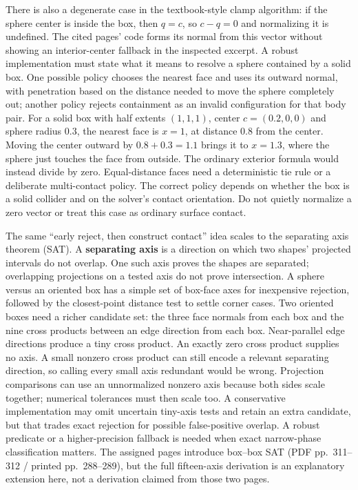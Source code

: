 There is also a degenerate case in the textbook-style clamp algorithm: if the sphere center is inside the box, then \(q=c\), so \(c-q=0\) and normalizing it is undefined. The cited pages' code forms its normal from this vector without showing an interior-center fallback in the inspected excerpt. A robust implementation must state what it means to resolve a sphere contained by a solid box. One possible policy chooses the nearest face and uses its outward normal, with penetration based on the distance needed to move the sphere completely out; another policy rejects containment as an invalid configuration for that body pair. For a solid box with half extents \((1,1,1)\), center \(c=(0.2,0,0)\) and sphere radius \(0.3\), the nearest face is \(x=1\), at distance \(0.8\) from the center. Moving the center outward by \(0.8+0.3=1.1\) brings it to \(x=1.3\), where the sphere just touches the face from outside. The ordinary exterior formula would instead divide by zero. Equal-distance faces need a deterministic tie rule or a deliberate multi-contact policy. The correct policy depends on whether the box is a solid collider and on the solver's contact orientation. Do not quietly normalize a zero vector or treat this case as ordinary surface contact.

The same ``early reject, then construct contact'' idea scales to the separating axis theorem (SAT). A \textbf{separating axis} is a direction on which two shapes' projected intervals do not overlap. One such axis proves the shapes are separated; overlapping projections on a tested axis do not prove intersection. A sphere versus an oriented box has a simple set of box-face axes for inexpensive rejection, followed by the closest-point distance test to settle corner cases. Two oriented boxes need a richer candidate set: the three face normals from each box and the nine cross products between an edge direction from each box. Near-parallel edge directions produce a tiny cross product. An exactly zero cross product supplies no axis. A small nonzero cross product can still encode a relevant separating direction, so calling every small axis redundant would be wrong. Projection comparisons can use an unnormalized nonzero axis because both sides scale together; numerical tolerances must then scale too. A conservative implementation may omit uncertain tiny-axis tests and retain an extra candidate, but that trades exact rejection for possible false-positive overlap. A robust predicate or a higher-precision fallback is needed when exact narrow-phase classification matters. The assigned pages introduce box--box SAT (PDF pp.~311--312 / printed pp.~288--289), but the full fifteen-axis derivation is an explanatory extension here, not a derivation claimed from those two pages.

